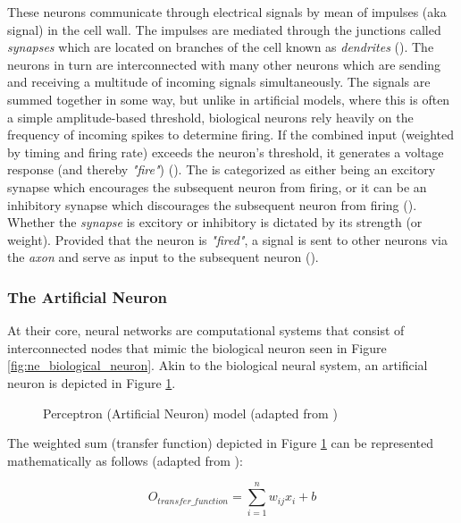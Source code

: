 \parbreak\noindent These neurons communicate through electrical signals by mean of impulses (aka signal) in the cell wall. The impulses are mediated through the junctions called \textit{synapses} which are located on branches of the cell known as \textit{dendrites} (\cite{gurney2018introduction}). The neurons in turn are interconnected with many other neurons which are sending and receiving a multitude of incoming signals simultaneously. The signals are summed together in some way, but unlike in artificial models, where this is often a simple amplitude-based threshold, biological neurons rely heavily on the frequency of incoming spikes to determine firing. If the combined input (weighted by timing and firing rate) exceeds the neuron's threshold, it generates a voltage response (and thereby \textit{"fire"}) (\cite{gurney2018introduction}). The  is categorized as either being an excitory synapse which encourages the subsequent neuron from firing, or it can be an inhibitory synapse which discourages the subsequent neuron from firing (\cite{bishop1994neural}). Whether the \textit{synapse} is excitory or inhibitory is dictated by its strength (or weight). Provided that the neuron is \textit{"fired"}, a signal is sent to other neurons via the \textit{axon} and serve as input to the subsequent neuron (\cite{gurney2018introduction}).

\subsubsection{The Artificial Neuron}
\noindent At their core, neural networks are computational systems that consist of interconnected nodes that mimic the biological neuron seen in Figure \ref{fig:ne_biological_neuron}. Akin to the biological neural system, an artificial neuron is depicted in Figure \ref{fig:ne_artificial_neuron}. 

\parbreak
\begin{figure}[H] %
	\centering %
	\caption{Perceptron (Artificial Neuron) model (adapted from \cite{russell2016artificial})}
	\label{fig:ne_artificial_neuron} %
\end{figure}

\parbreak\noindent The weighted sum (transfer function) depicted in Figure \ref{fig:ne_artificial_neuron} can be represented mathematically as follows (adapted from \cite{suzuki2011artificial}):
\begin{ceqn}
    \begin{equation}\label{alg:osum}
        O_{transfer\_function} = \sum_{i = 1}^{n}w_{ij}x_{i}+b
    \end{equation}
\end{ceqn}

